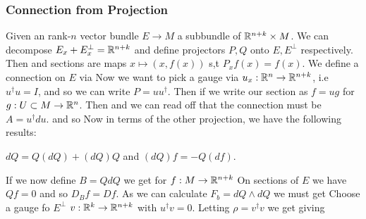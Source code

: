 \documentclass{article}
\begin{document}
\subsubsection{Connection from Projection}
Given an rank-$n$ vector bundle $E \to M$ a subbundle of $\mathbb{R}^{n+k} \times M$. We can decompose $E_x + E_x^\perp = \mathbb{R}^{n+k}$ and define projectors $P,Q$ onto $E,E^\perp$ respectively. Then 
and sections are maps $x \mapsto (x,f(x))$ s,t $P_xf(x) = f(x)$. We define a connection on $E$ via 
Now we want to pick a gauge via $u_x: \mathbb{R}^n \to \mathbb{R}^{n+k}$, i.e $u^\dagger u = I$, and so we can write $P = uu^\dagger$. Then if we write our section as $f=ug$ for $g:U \subset M \to \mathbb{R}^n$. Then
and we can read off that the connection must be $A = u^\dagger du$. and so 
Now in terms of the other projection, we have the following results:
\begin{lemma}
	$dQ = Q(dQ) + (dQ)Q$ and $(dQ)f = -Q(df)$. 
\end{lemma} 
If we now define $B = QdQ$ we get for $f: M \to \mathbb{R}^{n+k}$ 
On sections of $E$ we have $Qf=0$ and so $D_B f = Df$. As we can calculate $F_b = dQ \wedge dQ$ we must get 
Choose a gauge fo $E^\perp$ $v:\mathbb{R}^k \to \mathbb{R}^{n+k}$ with $u^\dagger v= 0$. Letting $\rho = v^\dagger v$ we get 
giving 
\end{document}
